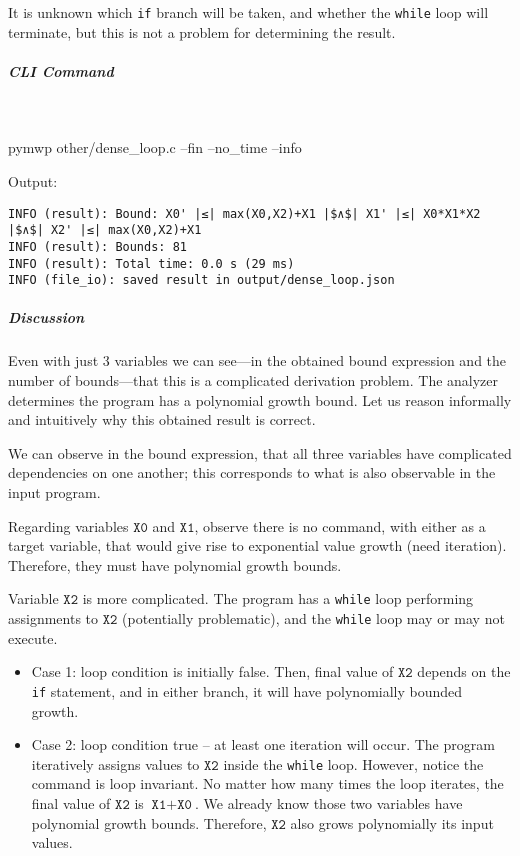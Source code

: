It is unknown which \texttt{if} branch will be taken, and whether the \texttt{while} loop will terminate, but this is not a problem for determining the result.

\subparagraph*{CLI Command}\mbox{}\\
\begin{console}[label={lst:ex5-run-cmd}]
pymwp other/dense_loop.c --fin --no_time --info
\end{console}

Output:

\begin{lstlisting}[label={lst:ex5-output}]
INFO (result): Bound: X0' |≤| max(X0,X2)+X1 |$∧$| X1' |≤| X0*X1*X2 |$∧$| X2' |≤| max(X0,X2)+X1
INFO (result): Bounds: 81
INFO (result): Total time: 0.0 s (29 ms)
INFO (file_io): saved result in output/dense_loop.json
\end{lstlisting}

\subparagraph*{Discussion}
Even with just 3 variables we can see---in the obtained bound expression and the number of bounds---that this is a complicated derivation problem.
The analyzer determines the program has a polynomial growth bound.
Let us reason informally and intuitively why this obtained result is correct.

We can observe in the bound expression, that all three variables have complicated dependencies on one another;
this corresponds to what is also observable in the input program.

Regarding variables \(\texttt{X0}\) and \(\texttt{X1}\), observe there is no command, with either as a target variable, that would give rise to exponential value growth (need iteration).
Therefore, they must have polynomial growth bounds.

Variable \(\texttt{X2}\) is more complicated.
The program has a \texttt{while} loop performing assignments to \(\texttt{X2}\) (potentially problematic), and the \texttt{while} loop may or may not execute.

\begin{itemize}

\item Case 1: loop condition is initially false.
Then, final value of \(\texttt{X2}\) depends on the \texttt{if} statement, and in either branch, it will have polynomially bounded growth.

\item Case 2: loop condition true -- at least one iteration will occur.
The program iteratively assigns values to \(\texttt{X2}\) inside the \texttt{while} loop.
However, notice the command is loop invariant.
No matter how many times the loop iterates, the final value of \(\texttt{X2}\) is \(\texttt{X1} + \texttt{X0}\).
We already know those two variables have polynomial growth bounds.
Therefore, \(\texttt{X2}\) also grows polynomially \wrt its input values.

\end{itemize}

